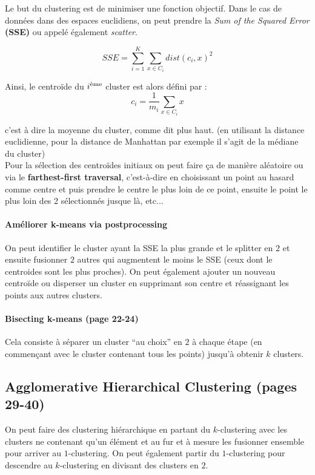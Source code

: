 \documentclass{article}
\begin{document}
\begin{sffamily}
Le but du clustering est de minimiser une fonction objectif. Dans le cas de données dans des espaces euclidiens, on peut prendre la
\textit{Sum of the Squared Error} \textbf{(SSE)} ou appelé également \textit{scatter}.

$$\boxed{SSE=\sum_{i=1}^K\sum_{x\in C_i} dist(c_i,x)^2}$$

Ainsi, le centroïde du $i^\text{\text{ème}}$ cluster est alors défini par : $$\boxed{c_i = \frac{1}{m_i} \sum_{x\in C_i} x}$$

c'est à dire la moyenne du cluster, comme dit plus haut. (en utilisant la distance euclidienne, pour la distance de Manhattan par exemple 
il s'agit de la médiane du cluster) \\

Pour la sélection des centroïdes initiaux on peut faire ça de manière aléatoire ou via le \textbf{farthest-first traversal}, c'est-à-dire 
en choisissant un point au hasard comme centre et puis prendre le centre le plus loin de ce point, ensuite le point le plus loin des 2 
sélectionnés jusque là, etc... 

\paragraph{Améliorer k-means via postprocessing} On peut identifier le cluster ayant la SSE la plus grande et le splitter en $2$ et ensuite 
fusionner $2$ autres qui augmentent le moins le SSE (ceux dont le centroides sont les plus proches). On peut également ajouter un nouveau 
centroïde ou disperser un cluster en supprimant son centre et réassignant les points aux autres clusters.

\paragraph{Bisecting k-means (page 22-24)} Cela consiste à séparer un cluster ``au choix'' en $2$ à chaque étape (en commençant avec le 
cluster contenant tous les points) jusqu'à obtenir $k$ clusters.

\subsection{Agglomerative Hierarchical Clustering (pages 29-40)}

On peut faire des clustering hiérarchique en partant du $k$-clustering avec les clusters ne contenant qu'un élément et au fur et à mesure 
les fusionner ensemble pour arriver au $1$-clustering. On peut également partir du $1$-clustering pour descendre au $k$-clustering en
divisant des clusters en $2$. \\


\end{sffamily}
\end{document}
